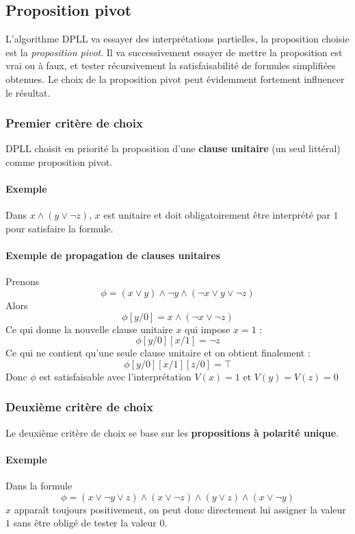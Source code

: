 \documentclass[a4paper]{article}
\begin{document}
  \subsection{Proposition pivot}
  L'algorithme DPLL va essayer des interprétations partielles, la proposition choisie
  est la \textit{proposition pivot}. Il va successivement essayer de mettre la 
  proposition est vrai ou à faux, et tester récursivement la satisfaisabilité de formules
  simplifiées obtenues. Le choix de la proposition pivot peut évidemment fortement
  influencer le résultat.

  \subsubsection{Premier critère de choix}
  DPLL choisit en priorité la proposition d'une \textbf{clause unitaire} (un seul littéral)
  comme proposition pivot. 

  \paragraph{Exemple} Dans $x \land (y \lor \lnot z)$, $x$ est unitaire et doit 
  obligatoirement être interprété par $1$ pour satisfaire la formule.

  \paragraph{Exemple de propagation de clauses unitaires}
  Prenons $$\phi = (x\lor y) \land \lnot y \land (\lnot x \lor y \lor \lnot z)$$
  Alors $$ \phi[y/0] = x \land (\lnot x \lor \lnot z) $$
  Ce qui donne la nouvelle clause unitaire $x$ qui impose $ x = 1 $ :
  $$ \phi[y/0][x/1] =  \lnot z$$ 
  Ce qui ne contient qu'une seule clause unitaire et on obtient finalement :
  $$ \phi[y/0][x/1][z/0] = \top $$
  Donc $\phi$ est satisfaisable avec l'interprétation $V(x) = 1$ et $V(y) = V(z) = 0$

  \subsubsection{Deuxième critère de choix}
  Le deuxième critère de choix se base sur les \textbf{propositions à polarité unique}.

  \paragraph{Exemple} Dans la formule 
  $$\phi = (x \lor \lnot y \lor z) \land (x \lor \lnot z) \land (y \lor z) \land (x \lor \lnot y) $$
  $x$ apparaît toujours positivement, on peut donc directement lui assigner la valeur $1$
  sans être obligé de tester la valeur $0$.
\end{document}
